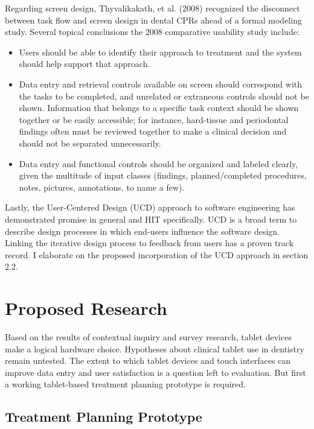 \documentclass[11pt]{article}
\begin{document}
Regarding screen design, Thyvalikakath, et al. (2008) recognized the disconnect between task flow and screen design in dental CPRs ahead of a formal modeling study. Several topical conclusions the 2008 comparative usability study include: \begin{itemize}
\item Users should be able to identify their approach to treatment and the system should help support that approach.
\item Data entry and retrieval controls available on screen should correspond with the tasks to be completed, and unrelated or extraneous controls should not be shown. Information that belongs to a specific task context should be shown together or be easily accessible; for instance, hard-tissue and periodontal findings often must be reviewed together to make a clinical decision and should not be separated unnecessarily.
\item Data entry and functional controls should be organized and labeled clearly, given the multitude of input classes (findings, planned/completed procedures, notes, pictures, annotations, to name a few).
\end{itemize}

Lastly, the User-Centered Design (UCD) approach to software engineering has demonstrated promise in general\cite{Bannon1986Issues-in-desig,Wixon1997The-usability-e,Gould1997How-to-design-u,Abras2004Encycolopeida-o} and HIT specifically.\cite{Johnson2005A-user-centered} UCD is a broad term to describe design processes in which end-users influence the software design. Linking the iterative design process to feedback from users has a proven track record. I elaborate on the proposed incorporation of the UCD approach in section 2.2.

\section{Proposed Research}
Based on the results of contextual inquiry and survey research, tablet devices make a logical hardware choice. Hypotheses about clinical tablet use in dentistry remain untested. The extent to which tablet devices and touch interfaces can improve data entry and user satisfaction is a question left to evaluation. But first a working tablet-based treatment planning prototype is required.

\subsection{Treatment Planning Prototype}
\end{document}
